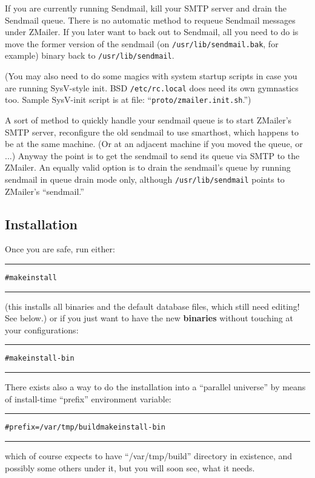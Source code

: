 If you are currently running Sendmail, kill your SMTP server
and drain the Sendmail queue.  There is no automatic method
to requeue Sendmail messages under ZMailer.  If you later want
to back out to Sendmail, all you need to do is move the former
version of the sendmail (on {\tt /usr/lib/sendmail.bak}, for example)
binary back to {\tt /usr/lib/sendmail}.

(You may also need to do some magics with system startup scripts
in case you are running SysV-style init. BSD {\tt /etc/rc.local}
does need its own gymnastics too.
Sample SysV-init script is at file: ``{\tt proto/zmailer.init.sh}.'')

A sort of method to quickly handle your sendmail queue is to
start ZMailer's SMTP server, reconfigure the old sendmail to
use smarthost, which happens to be at the same machine.
(Or at an adjacent machine if you moved the queue, or ...)
Anyway the point is to get the sendmail to send its queue
via SMTP to the ZMailer.
An equally valid option is to drain the sendmail's queue by running
sendmail in queue drain mode only, although {\tt /usr/lib/sendmail}
points to ZMailer's ``sendmail.''


\subsection{Installation}%

Once you are safe, run either:
\begin{alltt}\medskip\hrule\medskip
  # make install
\medskip\hrule\end{alltt}\medskip

(this installs all binaries and the default database files, which
still need editing! See below.)
or if you just want to have the new {\bf binaries} without touching
at your configurations:
\begin{alltt}\medskip\hrule\medskip
  # make install-bin
\medskip\hrule\end{alltt}\medskip

There exists also a way to do the installation into a ``parallel universe''
by means of install-time ``prefix'' environment variable:
\begin{alltt}\medskip\hrule\medskip
  # prefix=/var/tmp/build make install-bin
\medskip\hrule\end{alltt}\medskip
which of course expects to have ``/var/tmp/build'' directory in existence,
and possibly some others under it, but you will soon see, what it needs.


